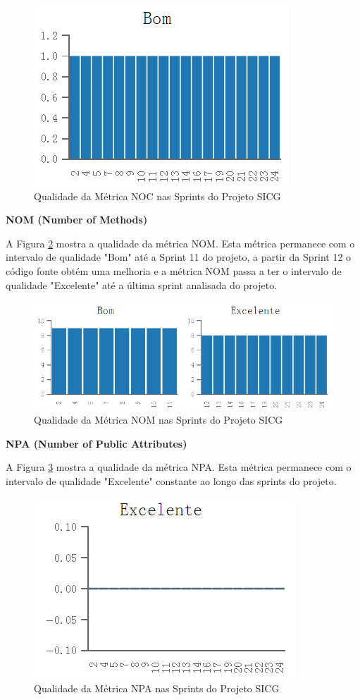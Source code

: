 \begin{figure}[H]
		\centering
			\includegraphics[scale=1.0]{figuras/noc.png}
		\caption{Qualidade da Métrica NOC nas Sprints do Projeto SICG}
		\label{noc}
\end{figure}


\textbf{NOM (Number of Methods)} 

A Figura \ref{nom} mostra a qualidade da métrica NOM. Esta métrica permanece com o intervalo de qualidade "Bom" até a Sprint 11 do projeto, a partir da Sprint 12 o código fonte obtém uma melhoria e a métrica NOM passa a ter o intervalo de qualidade "Excelente" até a última sprint analisada do projeto.

\begin{figure}[H]
		\centering
			\includegraphics[scale=0.9]{figuras/nom.png}
		\caption{Qualidade da Métrica NOM nas Sprints do Projeto SICG}
		\label{nom}
\end{figure}

\textbf{NPA (Number of Public Attributes)} 

A Figura \ref{npa} mostra a qualidade da métrica NPA. Esta métrica permanece com o intervalo de qualidade "Excelente" constante ao longo das sprints do projeto.

\begin{figure}[H]
		\centering
			\includegraphics[scale=1.0]{figuras/npa.png}
		\caption{Qualidade da Métrica NPA nas Sprints do Projeto SICG}
		\label{npa}
\end{figure}

